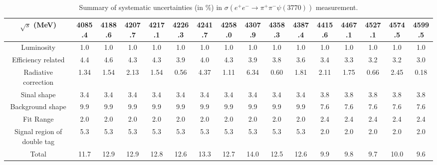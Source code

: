 \documentclass[aps,preprint,superscriptaddress,12pt,tightenlines]{revtex4}
\begin{document}
\begin{table}[htbp]
\scriptsize \caption{Summary of systematic uncertainties (in \%)
in $\sigma(e^{+}e^{-}\to \pi^{+}\pi^{-}\psi(3770))$ measurement.}
\label{sys_err_psipp}
\begin{tabular}{c c c c c c c c c c c c c c c c}
\hline \hline
     $\sqrt{s}$ (MeV) &4085.4 &4188.6 &4207.7  &4217.1  &4226.3  &4241.7 &4258.0  &4307.9   &4358.3  &4387.4   &4415.6  &4467.1   &4527.1  &4574.5   &4599.5\\
    \hline
    Luminosity                  & 1.0 & 1.0  & 1.0  & 1.0  & 1.0  & 1.0  &1.0   &1.0    & 1.0  & 1.0   & 1.0  & 1.0   & 1.0   & 1.0   & 1.0  \\
    Efficiency related          &4.4  &4.6   &4.3   &4.3   &3.9   &4.0   &4.3   &3.9    &3.8   &3.6    &3.4   &3.3    &3.2    &3.2    &3.0   \\
    Radiative correction        &1.34 &1.54  &2.13  &1.54  &0.56  &4.37  &1.11  &6.34   &0.60  &1.81   &2.11  &1.75   &0.66   &2.45   &0.18  \\
    Sinal shape                 &3.4  &3.4   &3.4   &3.4   &3.4   &3.4   &3.4   &3.4    &3.4   &3.4    &3.8   &3.8    &3.8    &3.8    &3.8   \\
    Background shape            &9.9  &9.9   &9.9   &9.9   &9.9   &9.9   &9.9   &9.9    &9.9   &9.9    &7.6   &7.6    &7.6    &7.6    &7.6   \\
    Fit Range                   &2.0  &2.0   &2.0   &2.0   &2.0   &2.0   &2.0   &2.0    &2.0   &2.0    &2.4   &2.4    &2.4    &2.4    &2.4   \\
    Signal region of double tag &5.3  &5.3   &5.3   &5.3   &5.3   &5.3   &5.3   &5.3    &5.3   &5.3    &2.0   &2.0    &2.0    &2.0    &2.0   \\
    \hline
    Total                       &11.7  &12.9  &12.9  &12.8  &12.6  &13.3  &12.7  &14.0  &12.5  &12.6  &9.9  &9.8  &9.7  &10.0  &9.6      \\
    \hline
    \hline
\end{tabular}
\end{table}
\end{document}
